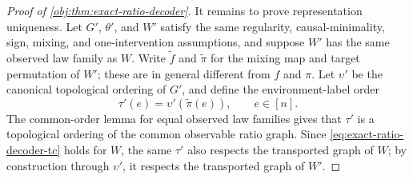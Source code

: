 \begin{proof}[Proof of \cref{obj:thm:exact-ratio-decoder}]
It remains to prove representation uniqueness. Let \(G'\), \(\theta'\), and \(W'\) satisfy the same regularity, causal-minimality, sign, mixing, and one-intervention assumptions, and suppose \(W'\) has the same observed law family as \(W\). Write \(\widetilde f\) and \(\widetilde\pi\) for the mixing map and target permutation of \(W'\); these are in general different from \(f\) and \(\pi\). Let \(\upsilon'\) be the canonical topological ordering of \(G'\), and define the environment-label order
\[
\tau'(e)=\upsilon'(\widetilde\pi(e)),
\qquad e\in[n].
\]
The common-order lemma for equal observed law families gives that \(\tau'\) is a topological ordering of the common observable ratio graph. Since \cref{eq:exact-ratio-decoder-tc} holds for \(W\), the same \(\tau'\) also respects the transported graph of \(W\); by construction through \(\upsilon'\), it respects the transported graph of \(W'\). %


\end{proof}
